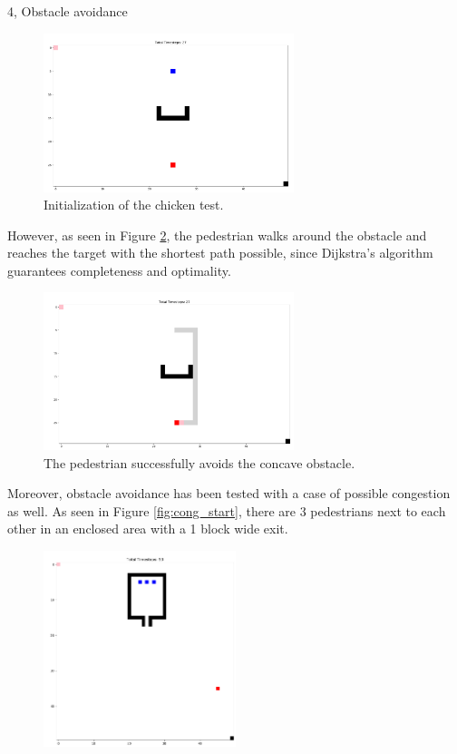 \documentclass[10pt,a4paper]{article}
\begin{document}
\begin{task}{4, Obstacle avoidance}
\begin{figure}[H]
    \centering
    \includegraphics[width=0.65\textwidth]{pictures/start_task4_obst.PNG}
    \caption{Initialization of the chicken test.}
    \label{fig:obst_start}
\end{figure}
However, as seen in Figure \ref{fig:obst_end}, the pedestrian walks around the obstacle and reaches the target with the shortest path possible, since Dijkstra’s algorithm guarantees completeness and optimality. \\
\begin{figure}[H]
    \centering
    \includegraphics[width=0.65\textwidth]{pictures/end_task4_obst.PNG}
    \caption{The pedestrian successfully avoids the concave obstacle.}
    \label{fig:obst_end}
\end{figure}
Moreover, obstacle avoidance has been tested with a case of possible congestion as well. As seen in Figure \ref{fig:cong_start}, there are 3 pedestrians next to each other in an enclosed area with a 1 block wide exit. 
\begin{figure}[H]
    \centering
    \includegraphics[width=0.5\textwidth]{pictures/start_task4_cong.PNG}

\end{figure}
\end{task}
\end{document}
